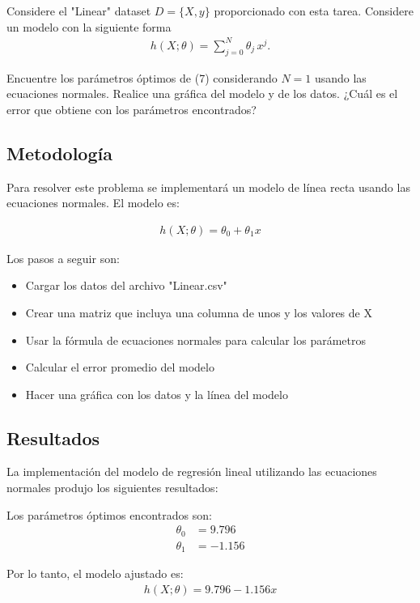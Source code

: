 \documentclass{article}
\begin{document}
Considere el "Linear" dataset $D=\{X, y\}$ proporcionado con esta tarea. Considere un modelo con la siguiente forma
\begin{align} \tag{7}
h(X;\theta) = \sum_{j=0}^{N} \theta_j\, x^j.
\end{align}

Encuentre los parámetros óptimos de (7) considerando $N=1$ usando las ecuaciones normales. Realice una gráfica del modelo y de los datos. ¿Cuál es el error que obtiene con los parámetros encontrados?

\subsection{Metodología}

Para resolver este problema se implementará un modelo de línea recta usando las ecuaciones normales. El modelo es:

\begin{align}
h(X;\theta) = \theta_0 + \theta_1 x
\end{align}

Los pasos a seguir son:
\begin{itemize}
    \item Cargar los datos del archivo "Linear.csv"
    \item Crear una matriz que incluya una columna de unos y los valores de X
    \item Usar la fórmula de ecuaciones normales para calcular los parámetros
    \item Calcular el error promedio del modelo
    \item Hacer una gráfica con los datos y la línea del modelo
\end{itemize}

\subsection{Resultados}
\setcounter{equation}{0}

La implementación del modelo de regresión lineal utilizando las ecuaciones normales produjo los siguientes resultados:

Los parámetros óptimos encontrados son:
\begin{align}
    \theta_0 &= 9.796 \\
    \theta_1 &= -1.156
\end{align}

Por lo tanto, el modelo ajustado es:
\begin{align}
    h(X;\theta) = 9.796 - 1.156x
\end{align}
\end{document}
